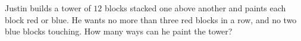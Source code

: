 Justin builds a tower of $12$ blocks stacked one above another and paints each block red or blue. He wants no more than three red blocks in a row, and no two blue blocks touching. How many ways can he paint the tower?
